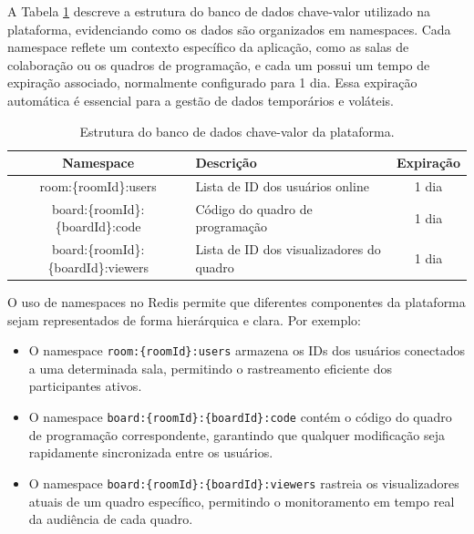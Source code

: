 A Tabela \ref{tab:key-value-database} descreve a estrutura do banco de dados chave-valor utilizado na plataforma, evidenciando como os dados são organizados em namespaces. Cada namespace reflete um contexto específico da aplicação, como as salas de colaboração ou os quadros de programação, e cada um possui um tempo de expiração associado, normalmente configurado para 1 dia. Essa expiração automática é essencial para a gestão de dados temporários e voláteis.

\begin{table}[H]
    \centering
    \renewcommand{\arraystretch}{1.3} 
    \begin{tabular}{|c|p{6cm}|c|}
        \hline
        \textbf{Namespace}                   & \textbf{Descrição}                       & \textbf{Expiração} \\
        \hline
        room:\{roomId\}:users                & Lista de ID dos usuários online          & 1 dia              \\
        \hline
        board:\{roomId\}:\{boardId\}:code    & Código do quadro de programação          & 1 dia              \\
        \hline
        board:\{roomId\}:\{boardId\}:viewers & Lista de ID dos visualizadores do quadro & 1 dia              \\ 
        
        \hline
    \end{tabular}
    \caption{Estrutura do banco de dados chave-valor da plataforma.}
    \label{tab:key-value-database}
\end{table}

O uso de namespaces no Redis permite que diferentes componentes da plataforma sejam representados de forma hierárquica e clara. Por exemplo:
\begin{itemize}
    \item O namespace \texttt{room:\{roomId\}:users} armazena os IDs dos usuários conectados a uma determinada sala, permitindo o rastreamento eficiente dos participantes ativos.
    \item O namespace \texttt{board:\{roomId\}:\{boardId\}:code} contém o código do quadro de programação correspondente, garantindo que qualquer modificação seja rapidamente sincronizada entre os usuários.
    \item O namespace \texttt{board:\{roomId\}:\{boardId\}:viewers} rastreia os visualizadores atuais de um quadro específico, permitindo o monitoramento em tempo real da audiência de cada quadro.
\end{itemize}

